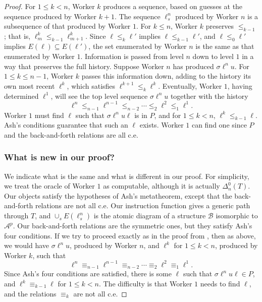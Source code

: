 \documentclass{article}
\theoremstyle{definition}
\begin{document}
\begin{proof}
		For $1\leq k < n$, Worker $k$ produces a sequence, based on guesses at the sequence produced by Worker $k+1$. The sequence $\ell^n_s$ produced by Worker $n$ is a subsequence of that produced by Worker $1$. For $k\leq n$, Worker $k$ preserves $\leq_{k-1}$; that is, $\ell^k_m\leq_{k-1}\ell^k_{m+1}$. Since $\ell\leq_k\ell'$ implies $\ell\leq_{k-1}\ell'$, and $\ell\leq_0\ell'$ implies $E(\ell)\subseteq E(\ell')$, the set enumerated by Worker $n$ is the same as that enumerated by Worker $1$. Information is passed from level $n$ down to level $1$ in a way that preserves the full history. Suppose Worker $n$ has produced $\sigma\ell^nu$. For $1\leq k\leq n-1$, Worker $k$ passes this information down, adding to the history its own most recent $\ell^k$, which satisfies $\ell^{k+1}\leq_k\ell^k$. Eventually, Worker $1$, having determined $\ell^1$, will see the top level sequence $\sigma\ell^nu$ together with the history 
		\[ \ell^n \leq_{n-1} \ell^{n-1} \leq_{n-2} \cdots \leq_2 \ell^2 \leq_1 \ell^1.\]
		Worker $1$ must find $\ell$ such that $\sigma\ell^nu\ell$ is in $P$, and for $1\leq k < n$, $\ell^k \leq_{k-1} \ell$. Ash's conditions guarantee that such an $\ell$ exists. Worker $1$ can find one since $P$ and the back-and-forth relations are all c.e. 
		
		\subsubsection{What is new in our proof?}
		
		We indicate what is the same and what is different in our proof. For simplicity, we treat the oracle of Worker $1$ as computable, although it is actually $\Delta^0_n(T)$. Our objects satisfy the hypotheses of Ash's metatheorem, except that the back-and-forth relations are not all c.e. Our instruction function gives a generic path through $T$, and $\cup_s E(\ell^n_s)$ is the atomic diagram of a structure $\mathcal{B}$ isomorphic to $\mathcal{A}^p$. Our back-and-forth relations are the symmetric ones, but they satisfy Ash's four conditions. If we try to proceed exactly as in the proof from \cite{AK00}, then as above, we would have $\sigma\ell^n u$, produced by Worker $n$, and $\ell^k$ for $1\leq k < n$, produced by Worker $k$, such that 
		\[ \ell^n \equiv_{n-1} \ell^{n-1} \equiv_{n-2} \cdots \equiv_2 \ell^2 \equiv_1 \ell^1.\]
		Since Ash's four conditions are satisfied, there is some $\ell$ such that $\sigma\ell^nu\ell\in P$, and $\ell^k \equiv_{k-1} \ell$ for $1\leq k<n$. The difficulty is that Worker $1$ needs to find $\ell$, and the relations $\equiv_k$ are not all c.e. 
		

\end{proof}
\end{document}
